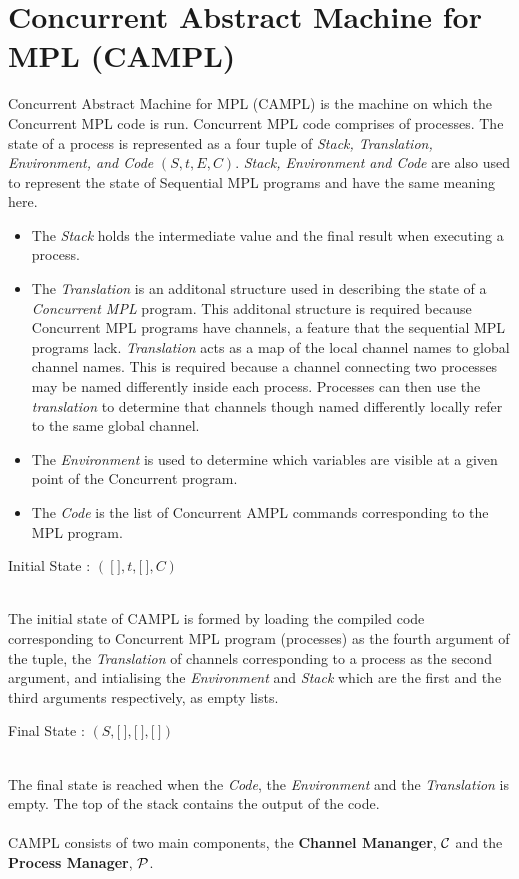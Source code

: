 \documentclass[11pt]{article}
\newcommand{\<}{\langle}
\renewcommand{\>}{\rangle}
\begin{document}
\section {Concurrent Abstract Machine for MPL (CAMPL)}
Concurrent Abstract Machine for MPL (CAMPL) is the machine on which the Concurrent MPL code is run. Concurrent MPL code comprises of processes. The state of a process is represented as a four tuple of {\em Stack, Translation, Environment, and Code} $(S,t,E,C)$. {\em Stack, Environment and Code} are also used to represent the state of Sequential MPL programs and have the same meaning here. 
\begin{itemize}
  \item The {\em Stack} holds the intermediate value and the final result when executing a process.
  \item The {\em Translation} is an additonal structure used in describing the state of a {\em Concurrent MPL} program. This additonal structure is required because Concurrent MPL programs have channels, a feature that the sequential MPL programs lack. {\em Translation} acts as a map of the local channel names to global channel names. This is required because a channel connecting two processes may be named differently inside each process. Processes can then use the {\em translation} to determine that channels though named differently locally refer to the same global  channel.

  \item The {\em Environment} is used to determine which variables are visible at a given point of the Concurrent program.
  \item The {\em Code} is the list of Concurrent AMPL commands corresponding to the MPL program.
\end{itemize}

\begin{center}
Initial State : $(~\lbrack~\rbrack,t,\lbrack~\rbrack,C)$
\end{center}
~~\\
The initial state of CAMPL is formed by loading the compiled code corresponding to Concurrent MPL program (processes) as the fourth argument of the tuple, the {\em Translation} of channels corresponding to a process as the second argument, and intialising the {\em Environment} and {\em Stack} which are the first and the third arguments respectively, as empty lists.
~~\\
\begin{center}
Final State : $(S,\lbrack~\rbrack,\lbrack~\rbrack,\lbrack~\rbrack)$
\end{center}
~~\\
The final state is reached when the {\em Code}, the {\em Environment} and the {\em Translation} is empty. The top of the stack contains the output of the code.
~~\\~~\\
CAMPL consists of two main components, the {\bf Channel Mananger}, $\cal C$ and the {\bf Process Manager}, $\cal P$.
\end{document}
